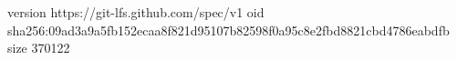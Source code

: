 version https://git-lfs.github.com/spec/v1
oid sha256:09ad3a9a5fb152ecaa8f821d95107b82598f0a95c8e2fbd8821cbd4786eabdfb
size 370122
